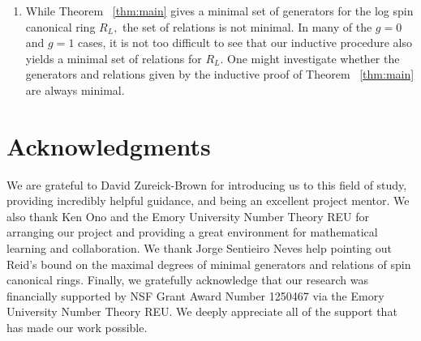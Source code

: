 \documentclass{amsart}
\theoremstyle{plain}
\newtheorem{question}[thm]{Question}
\theoremstyle{definition}
\theoremstyle{remark}
\numberwithin{equation}{section}
\DeclareMathOperator\di{Div}
\begin{document}
\begin{enumerate}
\begin{question}
\label{ques:spin-canonical-petri}
Given a {\rm(}non-stacky {\rm)} curve $X$ and a spin canonical divisor $L \in \di X$, can one write down a set of minimal generators and minimal relations for $R_L$? If so, can one give the generic ideal of $R_L$ or the generic initial ideal of $R_L$, as defined in Voight and Zureick Brown \cite[Definition 2.2.7]{vzb:stacky}?
\end{question}
In particular, if Question ~\ref{ques:spin-canonical-petri} were answered affirmatively one would be able to write down explicit generators and relations for $R_L$ on a stacky curve, essentially by inductively applying Lemma ~\ref{lem:raise-stacky-order}.
	\item While Theorem ~\ref{thm:main} gives a minimal set of generators for the log spin canonical ring $R_L,$ the set of relations is not minimal. In many of the $g = 0$ and $g=1$ cases, it is not too difficult to see that our inductive procedure also yields a minimal set of relations for $R_L$. One might investigate whether the generators and relations given by the inductive proof of Theorem ~\ref{thm:main} are always minimal.
	\end{enumerate}


\section{Acknowledgments}
We are grateful to David Zureick-Brown for introducing us to this
field of study, providing incredibly helpful guidance, and being an
excellent project mentor. We also thank Ken Ono and the Emory University
Number Theory REU for arranging our project and providing a great
environment for mathematical learning and collaboration. We thank Jorge Sentieiro Neves help pointing out Reid's bound on the maximal degrees of minimal generators and relations of spin canonical rings.
Finally, we
gratefully acknowledge that our research was financially supported by
NSF Grant Award Number 1250467 via the Emory University Number Theory REU.
We deeply appreciate all of the support that has made our work possible.


\nocite{*}
{}

\end{document}

